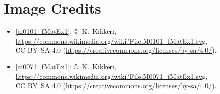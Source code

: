 

\label{m0057_Ch_End_Matter_Electrostatics_Steady_Current} %

\onecolumn
\section*{Image Credits}

\begin{itemize}

\item[Fig.] \label{m0101_fMatEx1_Credit}
  \ref{m0101_fMatEx1}:
  \copyright~K.\ Kikkeri, 
  \url{https://commons.wikimedia.org/wiki/File:M0101_fMatEx1.svg},\\ 
  CC BY~SA 4.0 (\url{https://creativecommons.org/licenses/by-sa/4.0/}).

\item[Fig.] \label{m0071_fMatEx1_Credit}
  \ref{m0071_fMatEx1}:
  \copyright~K.\ Kikkeri, 
  \url{https://commons.wikimedia.org/wiki/File:M0071_fMatEx1.svg},\\ 
  CC BY~SA 4.0 (\url{https://creativecommons.org/licenses/by-sa/4.0/}).

\end{itemize}

\twocolumn
